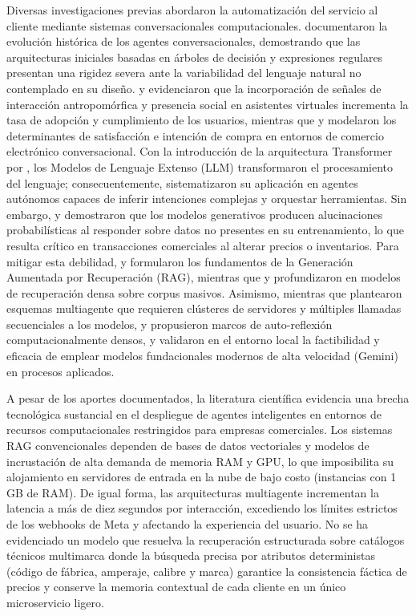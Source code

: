 Diversas investigaciones previas abordaron la automatización del servicio al cliente mediante sistemas conversacionales computacionales. \textcite{adamopoulou2020chatbots} documentaron la evolución histórica de los agentes conversacionales, demostrando que las arquitecturas iniciales basadas en árboles de decisión y expresiones regulares presentan una rigidez severa ante la variabilidad del lenguaje natural no contemplado en su diseño. \textcite{adam2021chatbots} y \textcite{sands2021who} evidenciaron que la incorporación de señales de interacción antropomórfica y presencia social en asistentes virtuales incrementa la tasa de adopción y cumplimiento de los usuarios, mientras que \textcite{ashfaq2020chatbot} y \textcite{han2023conversational} modelaron los determinantes de satisfacción e intención de compra en entornos de comercio electrónico conversacional. Con la introducción de la arquitectura Transformer por \textcite{vaswani2017attention}, los Modelos de Lenguaje Extenso (LLM) transformaron el procesamiento del lenguaje; consecuentemente, \textcite{wang2024survey} sistematizaron su aplicación en agentes autónomos capaces de inferir intenciones complejas y orquestar herramientas. Sin embargo, \textcite{ji2023hallucination} y \textcite{huang2023survey} demostraron que los modelos generativos producen alucinaciones probabilísticas al responder sobre datos no presentes en su entrenamiento, lo que resulta crítico en transacciones comerciales al alterar precios o inventarios. Para mitigar esta debilidad, \textcite{guu2020realm} y \textcite{lewis2020retrieval} formularon los fundamentos de la Generación Aumentada por Recuperación (RAG), mientras que \textcite{borgeaud2022improving} y \textcite{gao2023retrieval} profundizaron en modelos de recuperación densa sobre corpus masivos. Asimismo, mientras que \textcite{wu2023autogen} plantearon esquemas multiagente que requieren clústeres de servidores y múltiples llamadas secuenciales a los modelos, y \textcite{asai2024selfrag} propusieron marcos de auto-reflexión computacionalmente densos, \textcite{educsci14121330} y \textcite{Llerena-Izquierdo2024} validaron en el entorno local la factibilidad y eficacia de emplear modelos fundacionales modernos de alta velocidad (Gemini) en procesos aplicados.

A pesar de los aportes documentados, la literatura científica evidencia una brecha tecnológica sustancial en el despliegue de agentes inteligentes en entornos de recursos computacionales restringidos para empresas comerciales. Los sistemas RAG convencionales dependen de bases de datos vectoriales y modelos de incrustación de alta demanda de memoria RAM y GPU, lo que imposibilita su alojamiento en servidores de entrada en la nube de bajo costo (instancias con 1 GB de RAM). De igual forma, las arquitecturas multiagente incrementan la latencia a más de diez segundos por interacción, excediendo los límites estrictos de los webhooks de Meta y afectando la experiencia del usuario. No se ha evidenciado un modelo que resuelva la recuperación estructurada sobre catálogos técnicos multimarca donde la búsqueda precisa por atributos deterministas (código de fábrica, amperaje, calibre y marca) garantice la consistencia fáctica de precios y conserve la memoria contextual de cada cliente en un único microservicio ligero.

